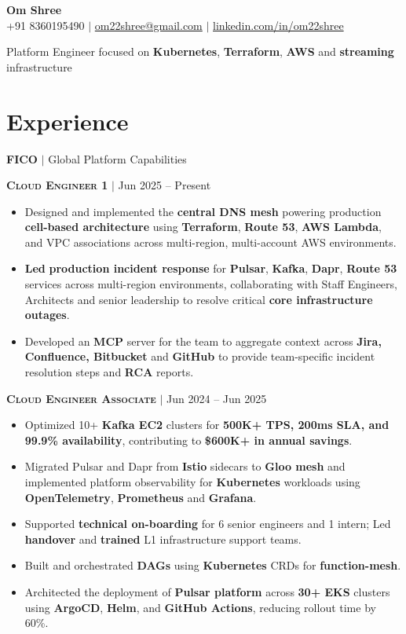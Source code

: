 \documentclass[12pt,a4paper]{article}
\newcommand{\resumeRole}[2]{%
  \vspace{3pt}
  \textbf{\textsc{#1}} $\mid$ #2
}
\begin{document}
\begin{center}
    {\Large \textbf{Om Shree}}\\[2pt]
    +91 8360195490 $\mid$ \href{mailto:om22shree@gmail.com}{om22shree@gmail.com} $\mid$
    \href{https://www.linkedin.com/in/om22shree}{linkedin.com/in/om22shree}
    
    Platform Engineer focused on \textbf{Kubernetes}, \textbf{Terraform}, \textbf{AWS} and \textbf{streaming} infrastructure
\end{center}

\section*{Experience}

\textbf{FICO} $\mid$ Global Platform Capabilities

\resumeRole{Cloud Engineer 1}{Jun 2025 -- Present}
\begin{itemize}
    \item Designed and implemented the \textbf{central DNS mesh} powering production \textbf{cell-based architecture} using \textbf{Terraform}, \textbf{Route 53}, \textbf{AWS Lambda}, and VPC associations across multi-region, multi-account AWS environments.
    \item \textbf{Led} \textbf{production incident response} for \textbf{Pulsar}, \textbf{Kafka}, \textbf{Dapr}, \textbf{Route 53} services across multi-region environments, collaborating with Staff Engineers, Architects and senior leadership to resolve critical \textbf{core infrastructure outages}.
    \item Developed an \textbf{MCP} server for the team to aggregate context across \textbf{Jira, Confluence, Bitbucket} and \textbf{GitHub} to provide team-specific incident resolution steps and \textbf{RCA} reports.
\end{itemize}

\resumeRole{Cloud Engineer Associate}{Jun 2024 -- Jun 2025}
\begin{itemize}
    \item Optimized 10+ \textbf{Kafka EC2} clusters for \textbf{500K+ TPS, 200ms SLA, and 99.9\% availability}, contributing to \textbf{\$600K+ in annual savings}.
    \item Migrated Pulsar and Dapr from \textbf{Istio} sidecars to \textbf{Gloo mesh} and implemented platform observability for \textbf{Kubernetes} workloads using \textbf{OpenTelemetry}, \textbf{Prometheus} and \textbf{Grafana}.
    \item Supported \textbf{technical on-boarding} for 6 senior engineers and 1 intern; Led \textbf{handover} and \textbf{trained} L1 infrastructure support teams.
    \item Built and orchestrated \textbf{DAGs} using \textbf{Kubernetes} CRDs for \textbf{function-mesh}.
    \item Architected the deployment of \textbf{Pulsar platform} across \textbf{30+ EKS} clusters using \textbf{ArgoCD}, \textbf{Helm}, and \textbf{GitHub Actions}, reducing rollout time by 60\%.
\end{itemize}
\end{document}
